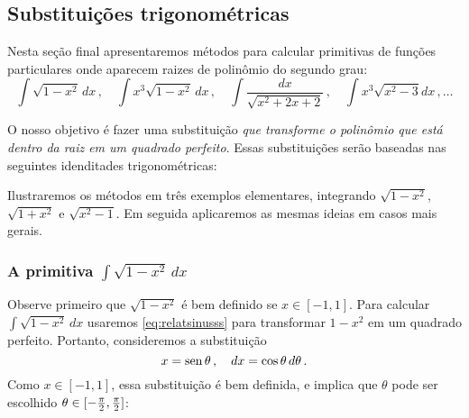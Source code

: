 \subsection{Substituições trigonométricas}\label{Sec:MetodoSubstitTrig}
Nesta seção final apresentaremos métodos para calcular primitivas de funções
particulares onde aparecem raizes de polinômio do segundo grau:
$$
\int \sqrt{1-x^2}\,dx\,,\quad
\int x^3{\sqrt{1-x^2}}\,dx\,,\quad
\int \frac{dx}{\sqrt{x^2+2x+2}}\,,\quad
\int x^3\sqrt{x^2-3}dx\,,\dots
$$

O nosso objetivo é fazer uma substituição \emph{que transforme o
polinômio que está dentro da raiz em um quadrado perfeito}. 
Essas substituições serão baseadas nas seguintes idenditades trigonométricas:


Ilustraremos os métodos em três exemplos elementares, integrando
$\sqrt{1-x^2}$, $\sqrt{1+x^2}$ e $\sqrt{x^2-1}$. Em seguida aplicaremos as
mesmas ideias em casos mais gerais.

\subsubsection{A primitiva $\int \sqrt{1-x^2}\,dx$}

Observe primeiro que $\sqrt{1-x^2}$ é bem definido se $x\in [-1,1]$.
Para calcular $\int \sqrt{1-x^2}\,dx$
usaremos \eqref{eq:relatsinusss} para
transformar $1-x^2$ em um quadrado perfeito.
Portanto, consideremos a substituição 
$$x=\operatorname{sen} \theta\,,\quad dx=\cos \theta\,d\theta\,.$$
Como $x\in [-1,1]$, 
essa substituição é bem definida, e implica que $\theta$ pode ser
escolhido $\theta\in [-\tfrac{\pi}{2},\tfrac{\pi}{2}]$:
\begin{center}
\begin{bmlimage}\end{bmlimage}
\end{center}

